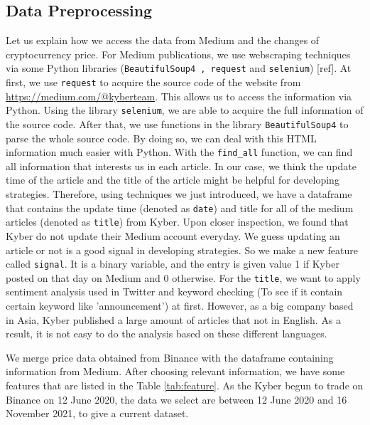 \documentclass[twoside]{report}
\newcommand{\code}{\texttt}
\begin{document}
\begin{spacing}{1}
\subsection{Data Preprocessing}
Let us explain how we access the data from Medium and the changes of cryptocurrency price. For Medium publications, we use webscraping techniques via some Python libraries (\code{BeautifulSoup4 , request} and \code{selenium}) [ref]. At first, we use \code{request} to acquire the source code of the website from \url{https://medium.com/@kyberteam}. This allows us to access the information via Python. Using the library \code{selenium}, we are able to acquire the full information of the source code. After that, we use functions in the library \code{BeautifulSoup4} to parse the whole source code. By doing so, we can deal with this HTML information much easier with Python. With the \code{find\_all} function, we can find all information that interests us in each article. In our case, we think the update time of the article and the title of the article might be helpful for developing strategies. Therefore, using techniques we just introduced, we have a dataframe that contains the update time (denoted as \code{date}) and title for all of the medium articles (denoted as \code{title}) from Kyber.
Upon closer inspection, we found that Kyber do not update their Medium account everyday. We guess updating an article or not is a good signal in developing strategies. So we make a new feature called \code{signal}. It is a binary variable, and the entry is given value 1 if Kyber posted on that day on Medium and 0 otherwise.  For the \code{title}, we want to apply sentiment analysis used in Twitter and keyword checking (To see if it contain certain keyword like 'announcement') at first. However, as a big company based in Asia, Kyber published a large amount of articles that not in English. As a result, it is not easy to do the analysis based on these different languages.  

We merge price data obtained from Binance with the dataframe containing information from Medium. After choosing relevant information, we have some features that are listed in the Table \ref{tab:feature}. As the Kyber begun to trade on Binance on 12 June 2020, the data we select are between 12 June 2020 and 16 November 2021, to give a current dataset. 



\end{spacing}
\end{document}
